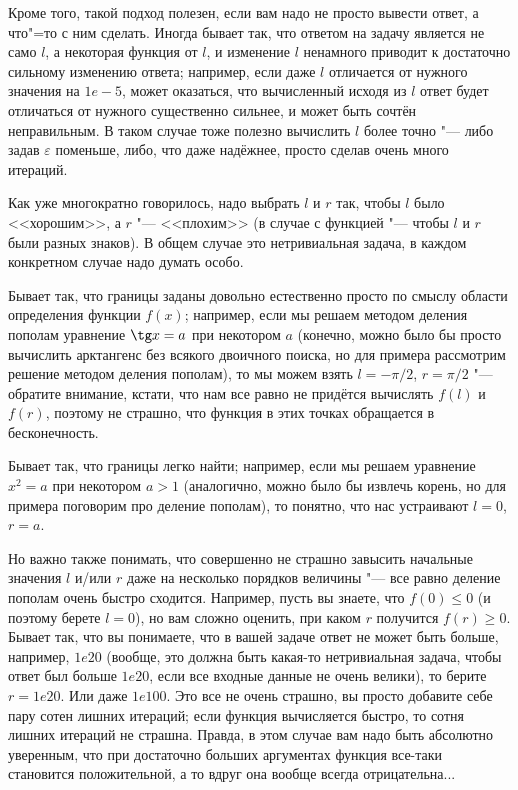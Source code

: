 \documentclass[a4paper,10pt]{problems}
\let\eps\varepsilon
\begin{document}
Кроме того, такой подход полезен, если вам надо не просто вывести ответ, а что"=то с ним сделать.
Иногда бывает так, что ответом на задачу является не само $l$, а некоторая функция от $l$, и изменение $l$ ненамного приводит
к достаточно сильному изменению ответа; например, если даже $l$ отличается от нужного значения на $1e{-}5$, может оказаться,
что вычисленный исходя из $l$ ответ будет отличаться от нужного существенно сильнее,
и может быть сочтён неправильным. 
В таком случае тоже полезно вычислить $l$ более точно "--- либо задав $\eps$ поменьше, либо, что даже надёжнее,
просто сделав очень много итераций.

 Как уже многократно говорилось, надо выбрать $l$ и $r$ так, чтобы $l$ было <<хорошим>>, а $r$ "--- <<плохим>>
(в случае с функцией "--- чтобы $l$ и $r$ были разных знаков). 
В общем случае это нетривиальная задача, в каждом конкретном случае надо думать особо.

Бывает так, что границы заданы довольно естественно просто по смыслу области определения функции $f(x)$;
например, если мы решаем методом деления пополам уравнение $\tg x=a$ при некотором $a$ 
(конечно, можно было бы просто вычислить арктангенс без всякого двоичного поиска, но для примера рассмотрим решение методом деления пополам), 
то мы можем взять $l=-\pi/2$, $r=\pi/2$ "--- обратите внимание, кстати, что нам все равно не придётся вычислять $f(l)$ и $f(r)$, поэтому не страшно,
что функция в этих точках обращается в бесконечность.

Бывает так, что границы легко найти; например, если мы решаем уравнение $x^2=a$ при некотором $a>1$
(аналогично, можно было бы извлечь корень, но для примера поговорим про деление пополам), то понятно,
что нас устраивают $l=0$, $r=a$.

Но важно также понимать, что совершенно не страшно завысить начальные значения $l$ и/или $r$ даже на несколько порядков величины
"--- все равно деление пополам очень быстро сходится.
Например, пусть вы знаете, что $f(0)\leq 0$ (и поэтому берете $l=0$), но вам сложно оценить, при каком $r$ получится $f(r)\geq 0$.
Бывает так, что вы понимаете, что в вашей задаче ответ не может быть больше, например, $1e20$ (вообще, это должна быть
какая-то нетривиальная задача, чтобы ответ был больше $1e20$, если все входные данные не очень велики), то берите $r=1e20$.
Или даже $1e100$. 
Это все не очень страшно, вы просто добавите себе пару сотен лишних итераций; если функция вычисляется быстро, то сотня лишних итераций не страшна.
Правда, в этом случае вам надо быть абсолютно уверенным, что при достаточно больших аргументах функция все-таки становится положительной,
а то вдруг она вообще всегда отрицательна...
\end{document}
